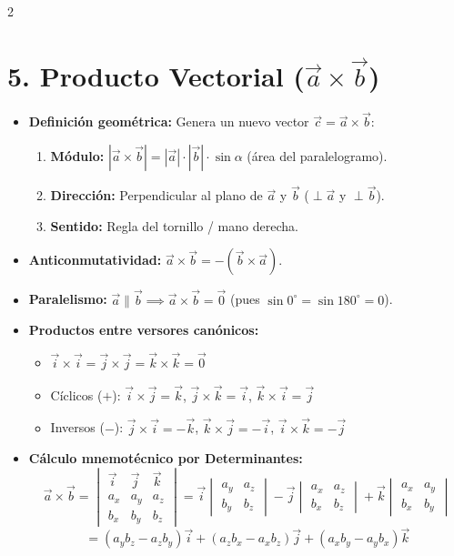 \documentclass[9pt,a4paper]{article}
\begin{document}
\begin{multicols}{2}
\section{5. Producto Vectorial ($\vec{a} \times \vec{b}$)}
\begin{itemize}
    \item \textbf{Definición geométrica:} Genera un nuevo vector $\vec{c} = \vec{a} \times \vec{b}$:
    \begin{enumerate}
        \item \textbf{Módulo:} $|\vec{a} \times \vec{b}| = |\vec{a}| \cdot |\vec{b}| \cdot \sin \alpha$ (área del paralelogramo).
        \item \textbf{Dirección:} Perpendicular al plano de $\vec{a}$ y $\vec{b}$ ($\perp \vec{a}$ y $\perp \vec{b}$).
        \item \textbf{Sentido:} Regla del tornillo / mano derecha.
    \end{enumerate}
    \item \textbf{Anticonmutatividad:} $\vec{a} \times \vec{b} = - (\vec{b} \times \vec{a})$.
    \item \textbf{Paralelismo:} $\vec{a} \parallel \vec{b} \implies \vec{a} \times \vec{b} = \vec{0}$ (pues $\sin 0^\circ = \sin 180^\circ = 0$).
    \item \textbf{Productos entre versores canónicos:}
    \begin{itemize}
        \item $\vec{i}\times\vec{i} = \vec{j}\times\vec{j} = \vec{k}\times\vec{k} = \vec{0}$
        \item Cíclicos ($+$): $\vec{i}\times\vec{j}=\vec{k}$, $\vec{j}\times\vec{k}=\vec{i}$, $\vec{k}\times\vec{i}=\vec{j}$
        \item Inversos ($-$): $\vec{j}\times\vec{i}=-\vec{k}$, $\vec{k}\times\vec{j}=-\vec{i}$, $\vec{i}\times\vec{k}=-\vec{j}$
    \end{itemize}
    \item \textbf{Cálculo mnemotécnico por Determinantes:}
    $$\vec{a}\times\vec{b} = \begin{vmatrix} \vec{i} & \vec{j} & \vec{k} \\ a_x & a_y & a_z \\ b_x & b_y & b_z \end{vmatrix} = \vec{i}\begin{vmatrix} a_y & a_z \\ b_y & b_z \end{vmatrix} - \vec{j}\begin{vmatrix} a_x & a_z \\ b_x & b_z \end{vmatrix} + \vec{k}\begin{vmatrix} a_x & a_y \\ b_x & b_y \end{vmatrix}$$
    $$= (a_y b_z - a_z b_y)\vec{i} + (a_z b_x - a_x b_z)\vec{j} + (a_x b_y - a_y b_x)\vec{k}$$
\end{itemize}


\end{multicols}
\end{document}
